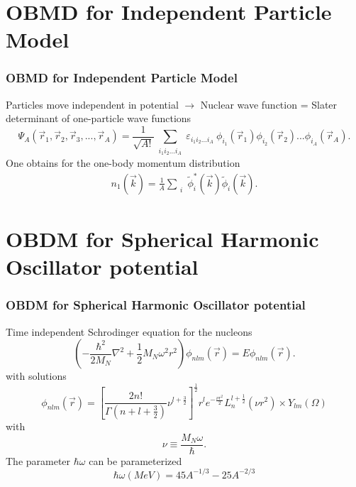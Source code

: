 \documentclass{beamer}
\begin{document}
\section{OBMD for Independent Particle Model}

\begin{frame}
\frametitle{OBMD for Independent Particle Model}
Particles move independent in potential $\rightarrow$ Nuclear wave function = Slater determinant of one-particle wave functions
\begin{equation*} \label{eq:slater}
\Psi_A(\vec{r}_1,\vec{r}_2,\vec{r}_3, ... ,\vec{r}_A)= \frac{1}{\sqrt{A!}} \sum_{\substack{i_1 i_2 \ldots i_A}} 
													  \varepsilon_{i_1 i_2 \ldots i_A}\  \phi_{i_1}(\vec{r}_1)
													         \phi_{i_2}(\vec{r}_2)...
													         \phi_{i_A}(\vec{r}_A).
\end{equation*}
One obtains for the one-body momentum distribution 
\begin{align*} 
	n_1(\vec{k})= \frac{1}{A} \sum_{\substack{i}} \tilde{\phi}^*_i(\vec{k})\tilde{\phi}_i(\vec{k}).
\end{align*}

\end{frame}

\section{OBDM for Spherical Harmonic Oscillator potential}

\begin{frame}
\frametitle{OBDM for Spherical Harmonic Oscillator potential}
Time independent Schrodinger equation for the nucleons
\begin{equation*} \label{eq:HO}
\left( -\frac{\hbar^2}{2M_N} \nabla^2 + \frac{1}{2} M_N \omega^2 r^2 \right) \phi_{nlm}(\vec{r}) = E\phi_{nlm}(\vec{r}).
\end{equation*}
with solutions 
\begin{equation*}
 \phi_{nlm}(\vec{r}) = \left[ \frac{2n!}{\Gamma(n+l+\frac{3}{2})}\nu^{l+\frac{3}{2}} \right]^{\frac{1}{2}} r^l e^{-\frac{\nu r^2}{2}} L^{l+\frac{1}{2}}_n(\nu r^2) \times Y_{lm}(\Omega) 
\end{equation*}
with
\begin{equation*}
\nu \equiv \frac{M_N \omega}{\hbar}.
\end{equation*}
The parameter $\hbar\omega$ can be parameterized
\begin{equation*}
\hbar\omega (MeV) = 45A^{-1/3}-25A^{-2/3}
\end{equation*}
\end{frame}
\end{document}
